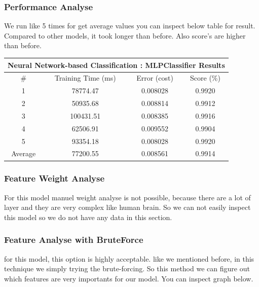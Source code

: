 \documentclass[a4paper]{article}
\begin{document}
\subsubsection{Performance Analyse}

We run like 5 times  for get average values you can inspect below table for result. Compared to other models, it took longer than before. Also score's are higher than before.

\begin{table}[H]
\centering
\begin{tabular}{|cccc|}
\hline
\multicolumn{4}{|c|}{\textbf{Neural Network-based Classification : MLPClassifier Results}} \\ \hline
\#               & Training Time (ms)          & Error (cost)         & Score (\%)         \\ \hline
1                & 78774.47                    & 0.008028             & 0.9920             \\
2                & 50935.68                    & 0.008814             & 0.9912             \\
3                & 100431.51                   & 0.008385             & 0.9916             \\
4                & 62506.91                    & 0.009552             & 0.9904             \\
5                & 93354.18                    & 0.008028             & 0.9920             \\ \hline
Average          & 77200.55                    & 0.008561             & 0.9914             \\ \hline
\end{tabular}
\end{table}

\subsubsection{Feature Weight Analyse}

For this model manuel weight analyse is not possible, because there are a lot of layer and they are very complex like human brain. So we can not easily inspect this model so we do not have any data in this section.

\subsubsection{Feature Analyse with BruteForce}

for this model, this option is highly acceptable. like we mentioned before, in this technique we simply trying the brute-forcing. So this method we can figure out which features are very importants for our model.
You can inspect graph below.
\end{document}
